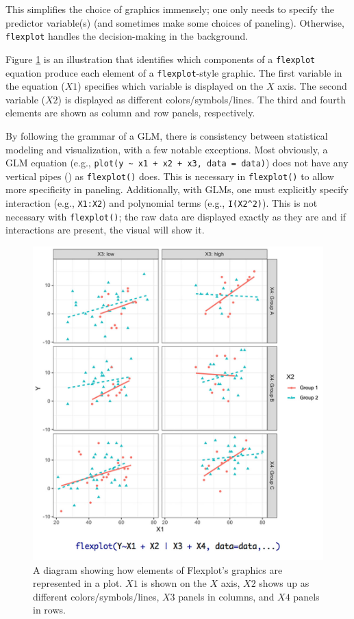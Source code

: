 \documentclass[
  man]{apa6}
\begin{document}
This simplifies the choice of graphics immensely; one only needs to specify the predictor variable(s) (and sometimes make some choices of paneling). Otherwise, \texttt{flexplot} handles the decision-making in the background.

Figure \ref{fig:flexplotgrammar} is an illustration that identifies which components of a \texttt{flexplot} equation produce each element of a \texttt{flexplot}-style graphic. The first variable in the equation (\(X1\)) specifies which variable is displayed on the \(X\) axis. The second variable (\(X2\)) is displayed as different colors/symbols/lines. The third and fourth elements are shown as column and row panels, respectively.

By following the grammar of a GLM, there is consistency between statistical modeling and visualization, with a few notable exceptions. Most obviously, a GLM equation (e.g., \texttt{plot(y\ \textasciitilde{}\ x1\ +\ x2\ +\ x3,\ data\ =\ data)}) does not have any vertical pipes (\texttt{\textbar{}}) as \texttt{flexplot()} does. This is necessary in \texttt{flexplot()} to allow more specificity in paneling. Additionally, with GLMs, one must explicitly specify interaction (e.g., \texttt{X1:X2}) and polynomial terms (e.g., \texttt{I(X2\^{}2)}). This is not necessary with \texttt{flexplot()}; the raw data are displayed exactly as they are and if interactions are present, the visual will show it.

\begin{figure}
\centering
\includegraphics{images/flexplot_diagram.jpg}
\caption{A diagram showing how elements of Flexplot's graphics are represented in a plot. $X1$ is shown on the $X$ axis, $X2$ shows up as different colors/symbols/lines, $X3$ panels in columns, and $X4$ panels in rows.}
\label{fig:flexplotgrammar}
\end{figure}
\end{document}
